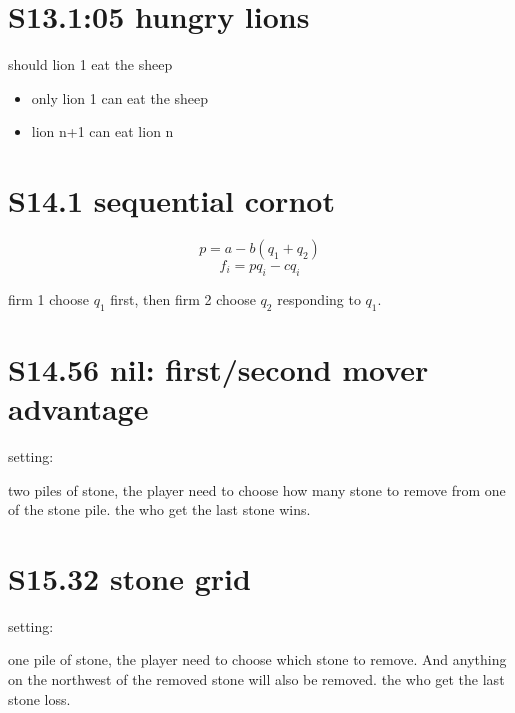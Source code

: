 \documentclass[12pt,a4paper]{article}
\begin{document}
\section{S13.1:05 hungry lions}
should lion 1 eat the sheep

\begin{itemize}
\item only lion 1 can eat the sheep
\item lion n+1 can eat lion n
\end{itemize}


\begin{center}
\end{center}

\section{S14.1 sequential cornot }
\[
p = a - b(q_1+q_2)
\]
\[
f_i = pq_i - cq_i
\]

firm 1 choose $q_1$ first, then firm 2 choose $q_2$ responding to $q_1$.

\section{S14.56 nil: first/second mover advantage}
setting:

two piles of stone, the player need to choose how many stone to remove from one of the stone pile. the who get the last stone wins.

\section{S15.32 stone grid}
setting:

one pile of stone, the player need to choose which stone to remove. And anything on the northwest of the removed stone will also be removed.
the who get the last stone loss.
\end{document}
